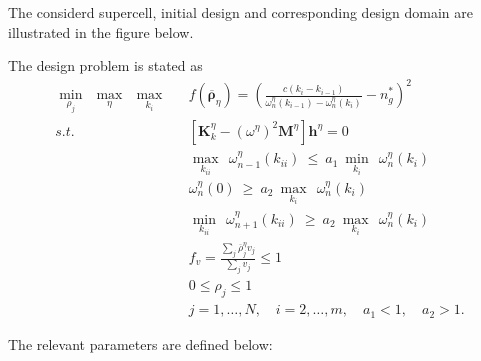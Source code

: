\documentclass{article}
\begin{document}
  The considerd supercell, initial design and corresponding design domain are illustrated in the figure below.   

	\begin{figure}[!h]
	\centering
	\def\svgwidth{1\textwidth}
	 
\end{figure}

The design problem is stated as
\begin{eqnarray}
	\min_{\rho_j} \ \ \max_{\eta}\ \ \max_{k_i} && f\left(\overline{\boldsymbol{\rho}}_\eta\right)= \left(\frac{c\left(k_i-k_{i-1}\right)}{{\omega}^{\eta}_n\left(k_{i-1}\right)-{\omega}^{\eta}_n\left(k_i\right)}-n^*_g\right)^2 \nonumber \\
	s.t.  && \left[ \mathbf{K}^{\eta}_k - \left({\omega}^{\eta} \right)^2 \mathbf{M}^{\eta} \right]\mathbf{h}^{\eta}=0  \nonumber \\
	&&  \max_{k_{ii}} \ \  {{\omega}^{\eta}_{n-1}\left(k_{ii}\right)} \  \leq \ a_1 \  \min_{k_i} \ \ {{\omega}^{\eta}_n\left(k_i\right)} \nonumber \\
	&&   {{\omega}^{\eta}_{n}\left(0\right)} \  \geq \ a_2 \ \max_{k_i} \ \ {{\omega}^{\eta}_n\left(k_i\right)}  \nonumber \\
	&& \min_{k_{ii}} \ \  {{\omega}^{\eta}_{n+1}\left(k_{ii}\right)} \  \geq \ a_2 \ \max_{k_i} \ \ {{\omega}^{\eta}_n\left(k_i\right)} \nonumber \\
	&&  f_v =\frac{\sum_{j} \overline{\rho}^{\eta}_j v_j}{\sum_{j} v_j }\leq 1 \nonumber \\
	&&   0\leq \rho_j \leq 1 \nonumber\\
	&& j=1,\ldots,N, \quad i=2,\ldots,m, \quad a_1 < 1, \quad a_2>1 . 
\end{eqnarray} 

The relevant parameters are defined below:
 
\end{document}
